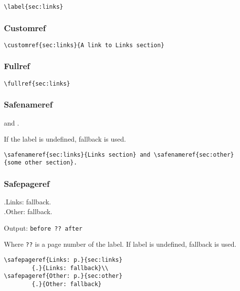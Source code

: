 \documentclass[itdr]{subfiles}
\begin{document}
\begin{lstlisting}
\label{sec:links}
\end{lstlisting}

\subsubsection{Customref}


\begin{lstlisting}
\customref{sec:links}{A link to Links section}
\end{lstlisting}

\subsubsection{Fullref}


\begin{lstlisting}
\fullref{sec:links}
\end{lstlisting}

\subsubsection{Safenameref}

 and .

If the label is undefined, fallback is used.

\begin{lstlisting}
\safenameref{sec:links}{Links section} and \safenameref{sec:other}{some other section}.
\end{lstlisting}

\subsubsection{Safepageref}

	{.}{Links: fallback.}\\
	{.}{Other: fallback.}

Output: \lstinline!before ?? after!

Where \lstinline!??! is a page number of the label. If label is undefined, fallback is used.

\begin{lstlisting}
\safepageref{Links: p.}{sec:links}
		{.}{Links: fallback}\\
\safepageref{Other: p.}{sec:other}
		{.}{Other: fallback}
\end{lstlisting}
\end{document}
